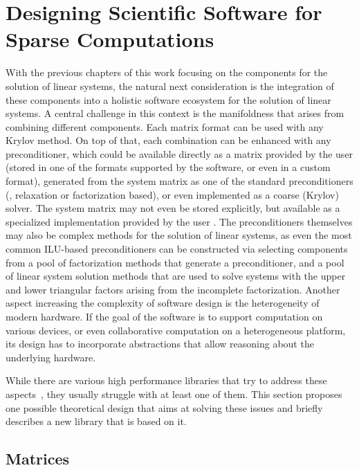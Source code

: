 \section{Designing Scientific Software for Sparse Computations}

With the previous chapters of this work focusing on the components for the
solution of linear systems, the natural next consideration is the integration of
these components into a holistic software ecosystem for the solution of linear
systems.  A central challenge in this context is the manifoldness that arises
from combining different components. Each matrix format can be used with any Krylov
method. On top of that, each combination can be enhanced with any
preconditioner, which could be available directly as a matrix provided by the
user (stored in one of the formats supported by the software, or even in a
custom format), generated from the system matrix as one of the standard
preconditioners (\eg, relaxation or factorization based), or even implemented as
a coarse (Krylov) solver. The system matrix may not even be stored explicitly,
but available as a specialized implementation provided by the user  . The preconditioners themselves may also be complex
methods for the solution of linear systems, as even the most common ILU-based
preconditioners can be constructed via selecting components from a pool of
factorization methods that generate a preconditioner, and a pool of linear
system solution methods that are used to solve systems with the upper and lower
triangular factors arising from the incomplete factorization. Another aspect
increasing the complexity of software design is the heterogeneity of modern
hardware. If the goal of the software is to support computation on various
devices, or even collaborative computation on a heterogeneous platform, its
design has to incorporate abstractions that allow reasoning about the underlying
hardware.

While there are various high performance libraries that try to address these
aspects~\cite{magma,vienna-cl,paralution}, they usually struggle with at least
one of them. This section proposes one possible theoretical design that aims at
solving these issues and briefly describes a new library that is based on it.

\subsection{Matrices}
\label{conclusion:ssec:matrices}

